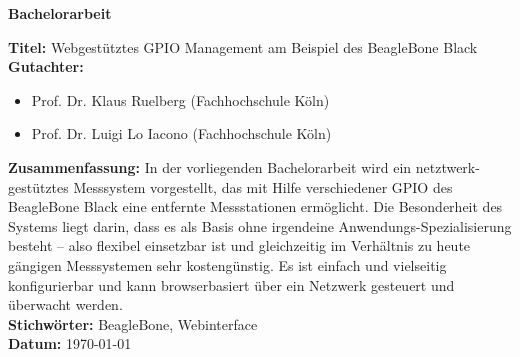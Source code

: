 \documentclass[thesis.tex]{subfiles}
\begin{document}
\begin{center}
	\textbf{Bachelorarbeit}
\end{center}

\noindent \textbf{Titel:} Webgestütztes GPIO Management am Beispiel des BeagleBone Black\\

\noindent \textbf{Gutachter:}
\begin{itemize}
	\item Prof. Dr. Klaus Ruelberg (Fachhochschule Köln)
	\item Prof. Dr. Luigi Lo Iacono (Fachhochschule Köln)
\end{itemize}

\noindent \textbf{Zusammenfassung:} In der vorliegenden Bachelorarbeit wird ein netztwerk-gestütztes Messsystem vorgestellt, das mit Hilfe verschiedener GPIO des BeagleBone Black eine entfernte Messstationen ermöglicht. Die Besonderheit des Systems liegt darin, dass es als Basis ohne irgendeine Anwendungs-Spezialisierung besteht – also flexibel einsetzbar ist und gleichzeitig im Verhältnis zu heute gängigen Messsystemen sehr kostengünstig.  Es ist einfach und vielseitig konfigurierbar und kann browserbasiert über ein Netzwerk gesteuert und überwacht werden.\\

\noindent \textbf{Stichwörter:} BeagleBone, Webinterface\\

\noindent \textbf{Datum:} {\longdate \today}
\end{document}
